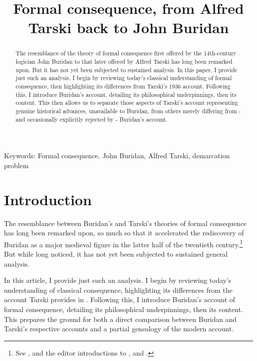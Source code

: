 \documentclass[]{article}
\title{Formal consequence, from Alfred Tarski back to John Buridan}
\author{}
\begin{document}
	
\maketitle
\begin{abstract}
	The resemblance of the theory of formal consequence first offered by the 14th-century logician John Buridan to that later offered by Alfred Tarski has long been remarked upon. But it has not yet been subjected to sustained analysis. In this paper, I provide just such an analysis. I begin by reviewing today's classical understanding of formal consequence, then highlighting its differences from Tarski's 1936 account. Following this, I introduce Buridan's account, detailing its philosophical underpinnings, then its content. This then allows us to separate those aspects of Tarski's account representing genuine historical advances, unavailable to Buridan, from others merely differing from - and occasionally explicitly rejected by - Buridan's account.
\end{abstract}
Keywords: Formal consequence, John Buridan, Alfred Tarski, demarcation problem

\section{Introduction}
The resemblance between Buridan's and Tarski's theories of formal consequence has long been remarked upon, 
so much so that it accelerated the rediscovery of Buridan as a major medieval figure in the latter half of the twentieth century.\footnote{See \cite{Moody1952} \cite{Kneale1962} \cite{Dumitriu1974} \cite{DutilhNovaes2012a} \cite{DutilhNovaes2012c} \cite{Parsons2014}, and the editor introductions to \cite{BuridanTC}, \cite{Kretzmann1982} and \cite{King1985}.} 
But while long noticed, 
it has not yet been subjected to sustained general analysis.

In this article, 
I provide just such an analysis. 
I begin by reviewing today's understanding of classical consequence, 
highlighting its differences from the account Tarski provides in \cite{Tarski2002}. 
Following this, 
I introduce Buridan's account of formal consequence, 
detailing its philosophical underpinnings, 
then its content. 
This prepares the ground for both a direct comparison between Buridan and Tarski's respective accounts and a partial genealogy of the modern account.
\end{document}
